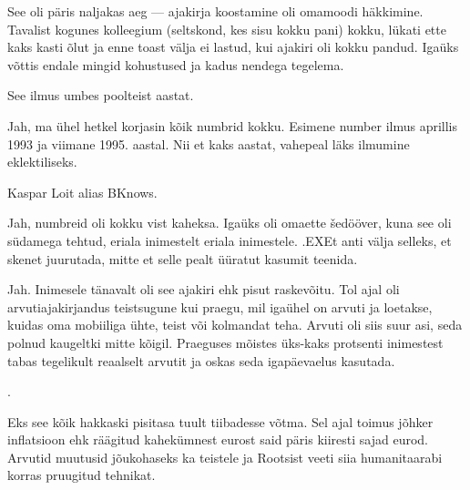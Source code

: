 See oli päris 
naljakas aeg --- ajakirja koostamine oli omamoodi 
häkkimine. Tavalist kogunes kolleegium (seltskond, kes sisu kokku pani) 
kokku, lükati ette kaks kasti õlut ja enne toast välja ei 
lastud, kui ajakiri oli kokku pandud. Igaüks võttis endale mingid kohustused 
ja kadus nendega tegelema.


See ilmus umbes poolteist aastat.


Jah, ma ühel hetkel korjasin kõik numbrid kokku. Esimene number ilmus aprillis 1993 ja viimane 
1995. aastal. Nii et kaks aastat, vahepeal läks ilmumine eklektiliseks.


Kaspar Loit alias BKnows.


Jah, numbreid oli kokku vist kaheksa. Igaüks oli omaette šedööver, kuna see oli südamega tehtud, eriala inimestelt eriala inimestele. .EXEt anti välja selleks, et skenet juurutada, mitte et selle pealt 
üüratut kasumit teenida. 


Jah. Inimesele tänavalt
oli see ajakiri ehk pisut raskevõitu. Tol ajal oli 
arvutiajakirjandus teistsugune kui praegu, mil
igaühel on arvuti ja loetakse, kuidas oma mobiiliga 
ühte, teist või kolmandat teha. Arvuti oli siis suur asi, 
seda polnud kaugeltki mitte kõigil. Praeguses mõistes üks-kaks protsenti inimestest tabas tegelikult reaalselt arvutit ja oskas seda 
igapäevaelus kasutada.

.

Eks see kõik hakkaski pisitasa tuult tiibadesse võtma. Sel ajal toimus 
jõhker inflatsioon ehk räägitud kahekümnest eurost said päris kiiresti 
sajad eurod. Arvutid muutusid jõukohaseks ka teistele ja Rootsist veeti siia humanitaarabi korras pruugitud tehnikat.

